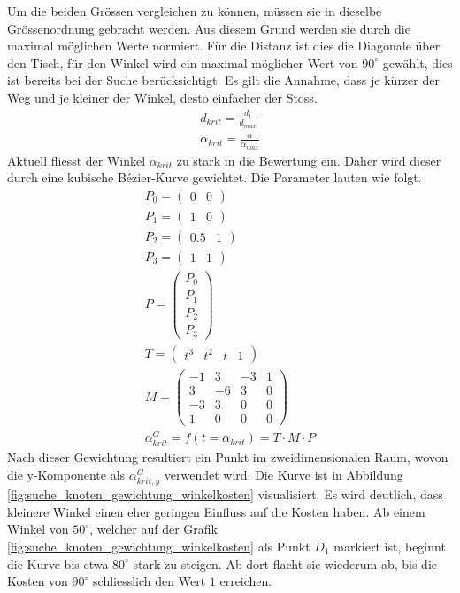 Um die beiden Grössen vergleichen zu können, müssen sie in dieselbe Grössenordnung gebracht werden. Aus diesem Grund
werden sie durch die maximal möglichen Werte normiert\cite{qucosa:ein_billardroboter:1}. Für die Distanz ist dies die
Diagonale über den Tisch, für den Winkel wird ein maximal möglicher Wert von $90^\circ$ gewählt, dies ist bereits bei
der Suche berücksichtigt. Es gilt die Annahme, dass je kürzer der Weg und je kleiner der Winkel,
desto einfacher der Stoss.
\begin{align}
    d_{krit} = \frac{d_i}{d_{max}}\\
    \alpha_{krit} = \frac{\alpha}{\alpha_{max}}
\end{align}
Aktuell fliesst der Winkel $\alpha_{krit}$ zu stark in die Bewertung ein. Daher wird dieser durch eine kubische
Bézier-Kurve\cite{wiki.bezier:1} gewichtet. Die Parameter lauten wie folgt.
\begin{align}
    P_0 = \begin{pmatrix} 0 & 0\end{pmatrix}\\
    P_1 = \begin{pmatrix} 1 & 0\end{pmatrix}\\
    P_2 = \begin{pmatrix} 0.5 & 1\end{pmatrix}\\
    P_3 = \begin{pmatrix} 1 & 1\end{pmatrix}\\
    P = \begin{pmatrix} P_0 \\ P_1 \\ P_2 \\ P_3\end{pmatrix}\\
    T = \begin{pmatrix} t^3 & t^2 & t & 1\end{pmatrix}\\
    M = \begin{pmatrix}
            -1 &  3 & -3 & 1\\
             3 & -6 &  3 & 0\\
            -3 &  3 &  0 & 0\\
             1 &  0 &  0 & 0
        \end{pmatrix}\\
    \alpha^G_{krit} = f(t = \alpha_{krit}) = T \cdot M \cdot P
\end{align}
Nach dieser Gewichtung resultiert ein Punkt im zweidimensionalen Raum, wovon die y-Komponente als $\alpha^G_{krit, y}$ verwendet wird.
Die Kurve ist in Abbildung \ref{fig:suche_knoten_gewichtung_winkelkosten}
visualisiert. Es wird deutlich, dass kleinere Winkel einen eher geringen Einfluss auf die Kosten haben.
Ab einem Winkel von $50^\circ$, welcher auf der Grafik \ref{fig:suche_knoten_gewichtung_winkelkosten} als Punkt $D_1$ markiert ist,
beginnt die Kurve bis etwa $80^\circ$ stark zu steigen. Ab dort flacht sie wiederum ab, bis die Kosten von $90^\circ$ schliesslich den Wert
$1$ erreichen.

